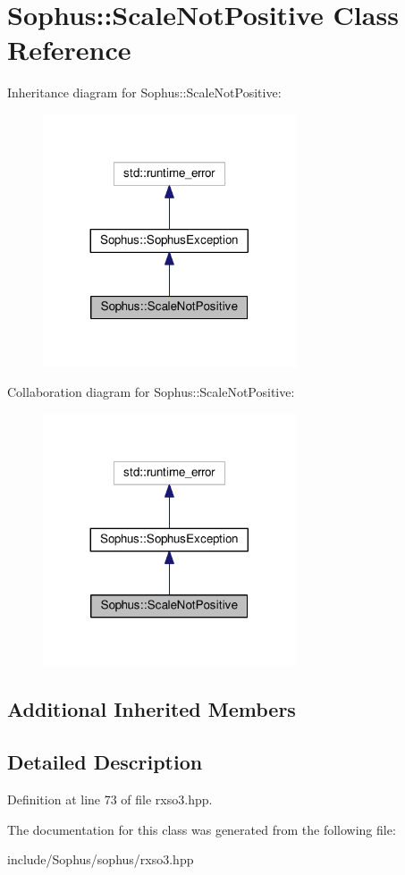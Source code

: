 \hypertarget{class_sophus_1_1_scale_not_positive}{}\section{Sophus\+:\+:Scale\+Not\+Positive Class Reference}
\label{class_sophus_1_1_scale_not_positive}


Inheritance diagram for Sophus\+:\+:Scale\+Not\+Positive\+:
\nopagebreak
\begin{figure}[H]
\begin{center}
\leavevmode
\includegraphics[width=212pt]{class_sophus_1_1_scale_not_positive__inherit__graph}
\end{center}
\end{figure}


Collaboration diagram for Sophus\+:\+:Scale\+Not\+Positive\+:
\nopagebreak
\begin{figure}[H]
\begin{center}
\leavevmode
\includegraphics[width=212pt]{class_sophus_1_1_scale_not_positive__coll__graph}
\end{center}
\end{figure}
\subsection*{Additional Inherited Members}


\subsection{Detailed Description}


Definition at line 73 of file rxso3.\+hpp.



The documentation for this class was generated from the following file\+:\begin{DoxyCompactItemize}
\item 
include/\+Sophus/sophus/rxso3.\+hpp\end{DoxyCompactItemize}
